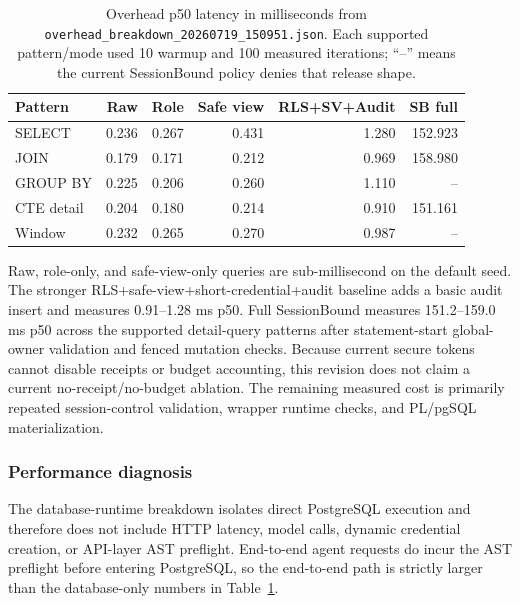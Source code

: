\documentclass[journal]{IEEEtran}
\begin{document}
\begin{table}[!t]
\centering
\scriptsize
\setlength{\tabcolsep}{2.2pt}
\caption{Overhead p50 latency in milliseconds from
\texttt{overhead\_breakdown\_20260719\_150951.json}. Each supported
pattern/mode used 10 warmup and 100 measured iterations; ``--'' means
the current SessionBound policy denies that release shape.}
\label{tab:performance}
\begin{tabular}{@{}lrrrrr@{}}
\toprule
Pattern & Raw & Role & Safe view & RLS+SV+Audit & SB full \\
\midrule
SELECT & 0.236 & 0.267 & 0.431 & 1.280 & 152.923 \\
JOIN & 0.179 & 0.171 & 0.212 & 0.969 & 158.980 \\
GROUP BY & 0.225 & 0.206 & 0.260 & 1.110 & -- \\
CTE detail & 0.204 & 0.180 & 0.214 & 0.910 & 151.161 \\
Window & 0.232 & 0.265 & 0.270 & 0.987 & -- \\
\bottomrule
\end{tabular}
\end{table}

Raw, role-only, and safe-view-only queries are sub-millisecond on the
default seed. The stronger RLS+safe-view+short-credential+audit baseline
adds a basic audit insert and measures 0.91--1.28 ms p50. Full
SessionBound measures 151.2--159.0 ms p50 across the supported
detail-query patterns after statement-start global-owner validation and
fenced mutation checks.
Because current secure tokens cannot disable receipts or budget accounting,
this revision does not claim a current no-receipt/no-budget ablation. The
remaining measured cost is primarily repeated session-control validation,
wrapper runtime checks, and PL/pgSQL materialization.

\hypertarget{performance-diagnosis}{%
\subsubsection{Performance diagnosis}\label{performance-diagnosis}}

The database-runtime breakdown isolates direct PostgreSQL execution and
therefore does not include HTTP latency, model calls, dynamic credential
creation, or API-layer AST preflight. End-to-end agent requests do incur
the AST preflight before entering PostgreSQL, so the end-to-end path is
strictly larger than the database-only numbers in
Table~\ref{tab:performance}.
\end{document}
